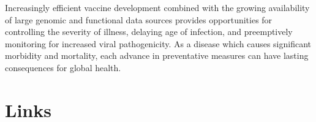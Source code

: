 \documentclass{article} %
\begin{document}
Increasingly efficient vaccine development combined with the growing availability of large genomic and functional data sources provides opportunities for controlling the severity of illness, delaying age of infection, and preemptively monitoring for increased viral pathogenicity. 
As a disease which causes significant morbidity and mortality, each advance in preventative measures can have lasting consequences for global health.





\section{Links}
\end{document}

